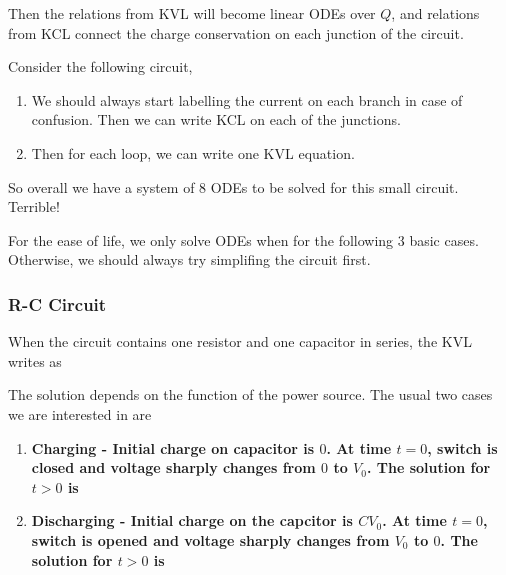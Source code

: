 \documentclass[class=article, crop=false, 12pt]{standalone}
\begin{document}
Then the relations from KVL will become linear ODEs over $Q$,
and relations from KCL connect the charge conservation on each junction of the circuit.

\begin{example}
    Consider the following circuit,


    \begin{enumerate}
        \item We should always start labelling the current on each branch in case of confusion. 
        Then we can write KCL on each of the junctions. 

        \item Then for each loop, we can write one KVL equation. 

    \end{enumerate}

    So overall we have a system of 8 ODEs to be solved for this small circuit. 
    Terrible!    

\end{example}

For the ease of life, we only solve ODEs when for the following 3 basic cases. 
Otherwise, we should always try simplifing the circuit first. 

\subsubsection{R-C Circuit}


When the circuit contains one resistor and one capacitor in series, 
the KVL writes as 

The solution depends on the function of the power source. 
The usual two cases we are interested in are
\begin{enumerate}
    \item \bf{Charging} - Initial charge on capacitor is $0$. 
    At time $t=0$, switch is closed and voltage sharply changes from $0$ to $V_0$.
    The solution for $t>0$ is 



    \item \bf{Discharging} - Initial charge on the capcitor is $CV_0$.
    At time $t=0$, switch is opened and voltage sharply changes from $V_0$ to $0$. 
    The solution for $t>0$ is 
    

\end{enumerate}    
\end{document}
